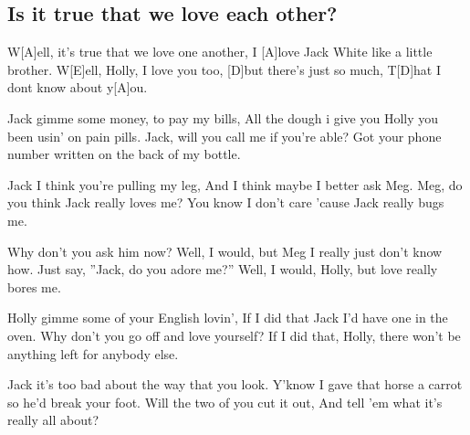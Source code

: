 \subsection*{Is it true that we love each other?   }
\begin{guitar}
W[A]ell, it's true that we love one another,
I [A]love Jack White like a little brother.
W[E]ell, Holly, I love you too, [D]but there's just so much,
T[D]hat I dont know about y[A]ou.

Jack gimme some money, to pay my bills,
All the dough i give you Holly you been usin' on pain pills.
Jack, will you call me if you're able?
Got your phone number written on the back of my bottle.

Jack I think you're pulling my leg,
And I think maybe I better ask Meg.
Meg, do you think Jack really loves me?
You know I don't care 'cause Jack really bugs me.

Why don't you ask him now?
Well, I would, but Meg I really just don't know how.
Just say, ''Jack, do you adore me?''
Well, I would, Holly, but love really bores me.

Holly gimme some of your English lovin',
If I did that Jack I'd have one in the oven.
Why don't you go off and love yourself?
If I did that, Holly, there won't be anything left for anybody else.

Jack it's too bad about the way that you look.
Y'know I gave that horse a carrot so he'd break your foot.
Will the two of you cut it out,
And tell 'em what it's really all about?

\end{guitar}
